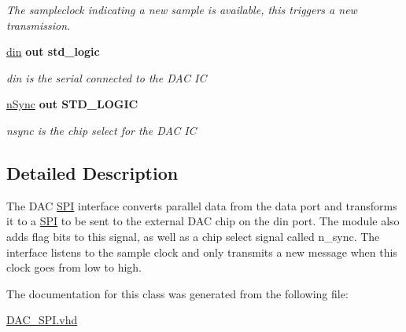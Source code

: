 \begin{DoxyCompactItemize}
\begin{DoxyCompactList}\small\item\em The sampleclock indicating a new sample is available, this triggers a new transmission. \end{DoxyCompactList}\item 
\hypertarget{classDAC__SPI_a85ffcdebe13d1f5ddc75d9dc2718accd}{\hyperlink{classDAC__SPI_a85ffcdebe13d1f5ddc75d9dc2718accd}{din}  {\bfseries {\bfseries \textcolor{vhdlkeyword}{out}\textcolor{vhdlchar}{ }}} {\bfseries \textcolor{comment}{std\-\_\-logic}\textcolor{vhdlchar}{ }} }\label{classDAC__SPI_a85ffcdebe13d1f5ddc75d9dc2718accd}

\begin{DoxyCompactList}\small\item\em din is the serial connected to the D\-A\-C I\-C \end{DoxyCompactList}\item 
\hypertarget{classDAC__SPI_acb508fc1279abe4c1bc2be47e4dd526b}{\hyperlink{classDAC__SPI_acb508fc1279abe4c1bc2be47e4dd526b}{n\-Sync}  {\bfseries {\bfseries \textcolor{vhdlkeyword}{out}\textcolor{vhdlchar}{ }}} {\bfseries \textcolor{comment}{S\-T\-D\-\_\-\-L\-O\-G\-I\-C}\textcolor{vhdlchar}{ }} }\label{classDAC__SPI_acb508fc1279abe4c1bc2be47e4dd526b}

\begin{DoxyCompactList}\small\item\em nsync is the chip select for the D\-A\-C I\-C \end{DoxyCompactList}\end{DoxyCompactItemize}


\subsection{Detailed Description}
The D\-A\-C \hyperlink{classDAC__SPI_1_1SPI}{S\-P\-I} interface converts parallel data from the data port and transforms it to a \hyperlink{classDAC__SPI_1_1SPI}{S\-P\-I} to be sent to the external D\-A\-C chip on the din port. The module also adds flag bits to this signal, as well as a chip select signal called n\-\_\-sync. The interface listens to the sample clock and only transmits a new message when this clock goes from low to high. 

The documentation for this class was generated from the following file\-:\begin{DoxyCompactItemize}
\item 
\hyperlink{DAC__SPI_8vhd}{D\-A\-C\-\_\-\-S\-P\-I.\-vhd}\end{DoxyCompactItemize}
